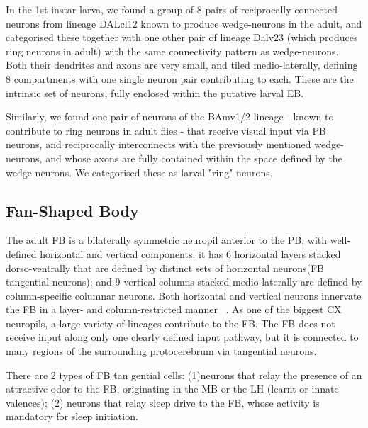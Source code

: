     In the 1st instar larva, we found a group of 8 pairs of reciprocally connected neurons from lineage DALcl12 known to produce wedge-neurons in the adult, and categorised these together with one other pair of lineage Dalv23 (which produces ring neurons in adult) with the same connectivity pattern as wedge-neurons. Both their dendrites and axons are very small, and tiled medio-laterally, defining 8 compartments with one single neuron pair contributing to each. These are the intrinsic set of neurons, fully enclosed within the putative larval EB. 

    Similarly, we found one pair of neurons of the BAmv1/2 lineage - known to contribute to ring neurons in adult flies - that receive visual input via PB neurons, and reciprocally interconnects with the previously mentioned wedge-neurons, and whose axons are fully contained within the space defined by the wedge neurons. We categorised these as larval "ring" neurons.


    \subsection{Fan-Shaped Body}


    The adult FB is a bilaterally symmetric neuropil anterior to the PB, with well-defined horizontal and vertical components: it has 6 horizontal layers stacked dorso-ventrally that are defined by distinct sets of horizontal neurons(FB tangential neurons); and 9 vertical columns stacked medio-laterally are defined by column-specific columnar neurons. Both horizontal and vertical neurons innervate the FB in a layer- and column-restricted manner ~\citep{heinze2017unraveling}. As one of the biggest CX neuropils, a large variety of lineages contribute to the FB.
    The FB does not receive input along only one clearly defined input pathway, but it is connected to many regions of the surrounding protocerebrum via tangential neurons. 

    There are 2 types of FB tan gential cells: (1)neurons that relay the presence of an attractive odor to the FB, originating in the MB or the LH (learnt or innate valences); (2) neurons that relay sleep drive to the FB, whose activity is mandatory for sleep initiation. 

